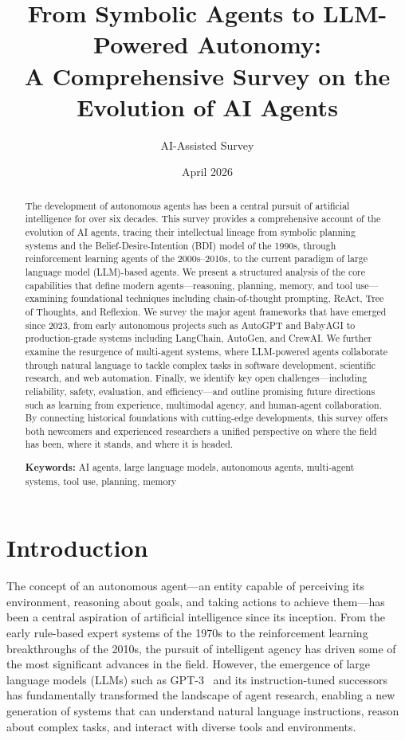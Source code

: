 \documentclass[11pt,a4paper]{article}
\title{\textbf{From Symbolic Agents to LLM-Powered Autonomy:\\ A Comprehensive Survey on the Evolution of AI Agents}}
\author{AI-Assisted Survey}
\date{April 2026}
\begin{document}
\maketitle

\begin{abstract}
\noindent
The development of autonomous agents has been a central pursuit of artificial intelligence for over six decades. This survey provides a comprehensive account of the evolution of AI agents, tracing their intellectual lineage from symbolic planning systems and the Belief-Desire-Intention (BDI) model of the 1990s, through reinforcement learning agents of the 2000s--2010s, to the current paradigm of large language model (LLM)-based agents. We present a structured analysis of the core capabilities that define modern agents---reasoning, planning, memory, and tool use---examining foundational techniques including chain-of-thought prompting, ReAct, Tree of Thoughts, and Reflexion. We survey the major agent frameworks that have emerged since 2023, from early autonomous projects such as AutoGPT and BabyAGI to production-grade systems including LangChain, AutoGen, and CrewAI. We further examine the resurgence of multi-agent systems, where LLM-powered agents collaborate through natural language to tackle complex tasks in software development, scientific research, and web automation. Finally, we identify key open challenges---including reliability, safety, evaluation, and efficiency---and outline promising future directions such as learning from experience, multimodal agency, and human-agent collaboration. By connecting historical foundations with cutting-edge developments, this survey offers both newcomers and experienced researchers a unified perspective on where the field has been, where it stands, and where it is headed.

\vspace{0.5em}
\noindent
\textbf{Keywords:} AI agents, large language models, autonomous agents, multi-agent systems, tool use, planning, memory
\end{abstract}

\section{Introduction}
\label{sec:intro}

The concept of an autonomous agent---an entity capable of perceiving its environment, reasoning about goals, and taking actions to achieve them---has been a central aspiration of artificial intelligence since its inception. From the early rule-based expert systems of the 1970s to the reinforcement learning breakthroughs of the 2010s, the pursuit of intelligent agency has driven some of the most significant advances in the field. However, the emergence of large language models (LLMs) such as GPT-3~\citep{brown2020language} and its instruction-tuned successors~\citep{ouyang2022training} has fundamentally transformed the landscape of agent research, enabling a new generation of systems that can understand natural language instructions, reason about complex tasks, and interact with diverse tools and environments.
\end{document}
